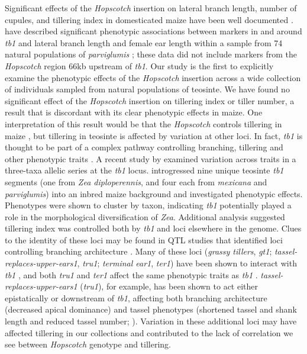 \documentclass[11pt]{article}
\begin{document}
\begin{linenumbers}
\begin{flushleft}
Significant effects of the \emph{Hopscotch} insertion on lateral branch length, number of cupules, and tillering index in domesticated maize have been well documented \citep{Studer2011}.  \citet{Weber2007} have described significant phenotypic associations between markers in and around \emph{tb1} and lateral branch length and female ear length within a sample from 74 natural populations of \emph{parviglumis} \citep{Weber2007}; these data did not include markers from the \emph{Hopscotch} region 66kb upstream of \emph{tb1}. Our study is the first to explicitly examine the phenotypic effects of the \emph{Hopscotch} insertion across a wide collection of individuals sampled from natural populations of teosinte. We have found no significant effect of the \emph{Hopscotch} insertion on tillering index or tiller number, a result that is discordant with its clear phenotypic effects in maize. One interpretation of this result would be that the \emph{Hopscotch} controls tillering in maize \citep{Studer2011}, but tillering in teosinte is affected by variation at other loci. In fact, \emph{tb1} is thought to be part of a complex pathway controlling branching, tillering and other phenotypic traits \citep{KebromBrutnell2007, Clark2006}. A recent study by \citet{StuderDoebley2012} examined variation across traits in a three-taxa allelic series at the \emph{tb1} locus. \citet{StuderDoebley2012} introgressed nine unique teosinte \emph{tb1} segments (one from \emph{Zea diploperennis}, and four each from \emph{mexicana} and \emph{parviglumis}) into an inbred maize background and investigated phenotypic effects. Phenotypes were shown to cluster by taxon, indicating \emph{tb1} potentially played a role in the morphological diversification of \emph{Zea}. Additional analysis suggested tillering index was controlled both by \emph{tb1} and loci elsewhere in the genome.  Clues to the identity of these loci may be found in QTL studies that identified loci controlling branching architecture \citep{DoebleyStec1991, DoebleyStec1993}. Many of these loci (\emph{grassy tillers}, \emph{gt1}; \emph{tassel-replaces-upper-ears1}, \emph{tru1}; \emph{terminal ear1}, \emph{ter1}) have been shown to interact with \emph{tb1} \citep{Whipple2011, Li2012},  and both \emph{tru1} and \emph{ter1} affect the same phenotypic traits as \emph{tb1} \citep{DoebleyStecGustus1995}. \emph{tassel-replaces-upper-ears1} (\emph{tru1}), for example, has been shown to act either epistatically or downstream of \emph{tb1}, affecting both branching architecture (decreased apical dominance) and tassel phenotypes (shortened tassel and shank length and reduced tassel number; \citealt{Li2012}). Variation in these additional loci may have affected tillering in our collections and contributed to the lack of correlation we see between \emph{Hopscotch} genotype and tillering. 


\end{flushleft}
\end{linenumbers}
\end{document}
